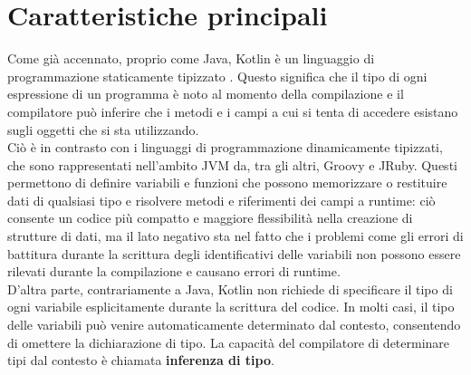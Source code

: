 \section{Caratteristiche principali}
Come già accennato, proprio come Java, Kotlin è un linguaggio di programmazione staticamente tipizzato \cite{kotlinWiki}.
Questo significa che il tipo di ogni espressione di un programma è noto al momento della compilazione
e il compilatore può inferire che i metodi e i campi a cui si tenta di accedere esistano sugli oggetti
che si sta utilizzando. \\
Ciò è in contrasto con i linguaggi di programmazione dinamicamente tipizzati, che sono
rappresentati nell'ambito JVM da, tra gli altri, Groovy e JRuby. Questi permettono di
definire variabili e funzioni che possono memorizzare o restituire dati di qualsiasi tipo e risolvere metodi
e riferimenti dei campi a runtime: ciò consente un codice più compatto e maggiore
flessibilità nella creazione di strutture di dati, ma il lato negativo sta nel fatto che i problemi come gli errori
di battitura durante la scrittura degli identificativi delle variabili non possono essere rilevati durante
la compilazione e causano errori di runtime.\\
D'altra parte, contrariamente a Java, Kotlin non richiede di specificare il tipo di ogni variabile
esplicitamente durante la scrittura del codice. In molti casi, il tipo delle variabili può venire
automaticamente determinato dal contesto, consentendo di omettere la dichiarazione di tipo.
La capacità del compilatore di determinare tipi dal contesto è chiamata {\bfseries inferenza di tipo}. \\

